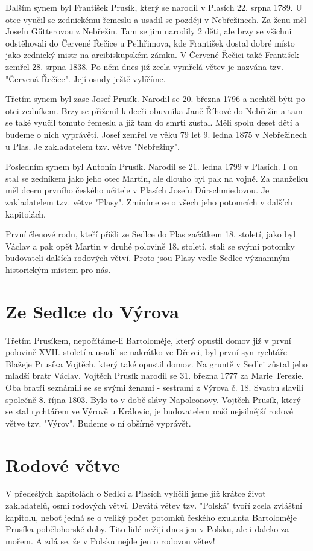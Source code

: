 \documentclass[../dejiny-rodu-prusiku.tex]{subfiles}
\begin{document}
Dalším synem byl František Prusík, který se narodil v Plasích 22. srpna 1789. U otce vyučil se zednickému řemeslu a usadil se později v Nebřežinech. Za ženu měl Josefu Gűtterovou z Nebřežin. Tam se jim narodily 2 děti, ale brzy se všichni odstěhovali do Červené Řečice u Pelhřimova, kde František dostal dobré místo jako zednický mistr na arcibiskupském zámku. V Červené Řečici také František zemřel 28. srpna 1838. Po něm dnes již zcela vymřelá větev je nazvána tzv. "Červená Řečíce". Její osudy ještě vylíčíme.

Třetím synem byl zase Josef Prusík. Narodil se 20. března 1796 a nechtěl býti po otci zedníkem. Brzy se přiženil k dceři obuvníka Janě Říhové do Nebřežin a tam se také vyučil tomuto řemeslu a již tam do smrti zůstal. Měli spolu deset dětí a budeme o nich vyprávěti. Josef zemřel ve věku 79 let 9. ledna 1875 v Nebřežinech u Plas. Je zakladatelem tzv. větve "Nebřežiny".

Posledním synem byl Antonín Prusík. Narodil se 21. ledna 1799 v Plasích. I on stal se zedníkem jako jeho otec Martin, ale dlouho byl pak na vojně. Za manželku měl dceru prvního českého učitele v Plasích Josefu Dűrschmiedovou. Je zakladatelem tzv. větve "Plasy". Zmíníme se o všech je­ho potomcích v dalších kapitolách.

První členové rodu, kteří přišli ze Sedlce do Plas začátkem 18. století, jako byl Václav a pak opět Martin v druhé polovině 18. století, stali se svý­mi potomky budovateli dalších rodových větví. Proto jsou Plasy vedle Sedlce významným historickým místem pro nás.

\section{Ze Sedlce do Výrova}
Třetím Prusíkem, nepočítáme-li Bartoloměje, který opustil domov již v první polovině XVII. století a usadil se nakrátko ve Dřevci, byl první syn rychtáře Blažeje Prusíka Vojtěch, který také opustil domov. Na gruntě v Sedlci zůstal jeho mladší bratr Václav. Vojtěch Prusík narodil se 31. března 1777 za Marie Terezie. Oba bratři seznámili se se svými ženami - sestrami z Výrova č. 18. Svatbu sla­vili společně 8. října 1803. Bylo to v době slávy Napoleonovy. Vojtěch Prusík, který se stal rychtářem ve Výrově u Královic, je budovatelem naší nejsilnější rodové větve tzv. "Výrov". Budeme o ní obšírně vyprá­vět.

\section{Rodové větve}
V předešlých kapitolách o Sedlci a Plasích vylí­čili jsme již krátce život zakladatelů, osmi rodo­vých větví. Devátá větev tzv. "Polská" tvoří zcela zvláštní kapitolu, neboť jedná se o veliký po­čet potomků českého exulanta Bartoloměje Prusíka pobělohorské doby. Tito lidé nežijí dnes jen v Polsku, ale i daleko za mořem. A zdá se, že v Polsku nejde jen o rodovou větev!
\end{document}
